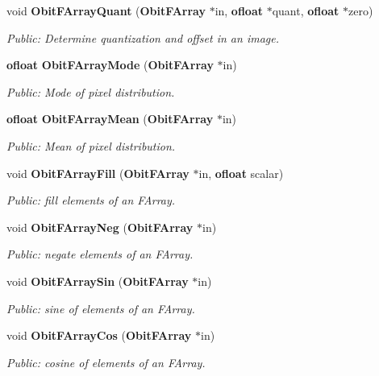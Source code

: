 \begin{CompactItemize}
void {\bf Obit\-FArray\-Quant} ({\bf Obit\-FArray} $\ast$in, {\bf ofloat} $\ast$quant, {\bf ofloat} $\ast$zero)
\begin{CompactList}\small\item\em Public: Determine quantization and offset in an image. \item\end{CompactList}\item 
{\bf ofloat} {\bf Obit\-FArray\-Mode} ({\bf Obit\-FArray} $\ast$in)
\begin{CompactList}\small\item\em Public: Mode of pixel distribution. \item\end{CompactList}\item 
{\bf ofloat} {\bf Obit\-FArray\-Mean} ({\bf Obit\-FArray} $\ast$in)
\begin{CompactList}\small\item\em Public: Mean of pixel distribution. \item\end{CompactList}\item 
void {\bf Obit\-FArray\-Fill} ({\bf Obit\-FArray} $\ast$in, {\bf ofloat} scalar)
\begin{CompactList}\small\item\em Public: fill elements of an FArray. \item\end{CompactList}\item 
void {\bf Obit\-FArray\-Neg} ({\bf Obit\-FArray} $\ast$in)
\begin{CompactList}\small\item\em Public: negate elements of an FArray. \item\end{CompactList}\item 
void {\bf Obit\-FArray\-Sin} ({\bf Obit\-FArray} $\ast$in)
\begin{CompactList}\small\item\em Public: sine of elements of an FArray. \item\end{CompactList}\item 
void {\bf Obit\-FArray\-Cos} ({\bf Obit\-FArray} $\ast$in)
\begin{CompactList}\small\item\em Public: cosine of elements of an FArray. \item\end{CompactList}\item 

\end{CompactItemize}
